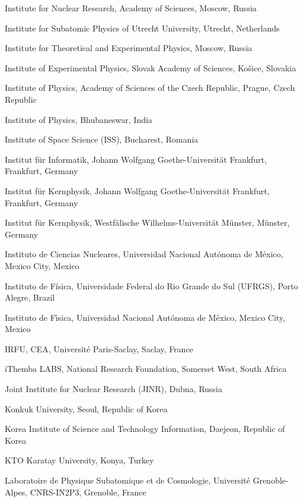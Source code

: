 \begin{flushleft}
\begin{Authlist}
\item {}Institute for Nuclear Research, Academy of Sciences, Moscow, Russia
\item {}Institute for Subatomic Physics of Utrecht University, Utrecht, Netherlands
\item {}Institute for Theoretical and Experimental Physics, Moscow, Russia
\item {}Institute of Experimental Physics, Slovak Academy of Sciences, Ko\v{s}ice, Slovakia
\item {}Institute of Physics, Academy of Sciences of the Czech Republic, Prague, Czech Republic
\item {}Institute of Physics, Bhubaneswar, India
\item {}Institute of Space Science (ISS), Bucharest, Romania
\item {}Institut f\"{u}r Informatik, Johann Wolfgang Goethe-Universit\"{a}t Frankfurt, Frankfurt, Germany
\item {}Institut f\"{u}r Kernphysik, Johann Wolfgang Goethe-Universit\"{a}t Frankfurt, Frankfurt, Germany
\item {}Institut f\"{u}r Kernphysik, Westf\"{a}lische Wilhelms-Universit\"{a}t M\"{u}nster, M\"{u}nster, Germany
\item {}Instituto de Ciencias Nucleares, Universidad Nacional Aut\'{o}noma de M\'{e}xico, Mexico City, Mexico
\item {}Instituto de F\'{i}sica, Universidade Federal do Rio Grande do Sul (UFRGS), Porto Alegre, Brazil
\item {}Instituto de F\'{\i}sica, Universidad Nacional Aut\'{o}noma de M\'{e}xico, Mexico City, Mexico
\item {}IRFU, CEA, Universit\'{e} Paris-Saclay, Saclay, France
\item {}iThemba LABS, National Research Foundation, Somerset West, South Africa
\item {}Joint Institute for Nuclear Research (JINR), Dubna, Russia
\item {}Konkuk University, Seoul, Republic of Korea
\item {}Korea Institute of Science and Technology Information, Daejeon, Republic of Korea
\item {}KTO Karatay University, Konya, Turkey
\item {}Laboratoire de Physique Subatomique et de Cosmologie, Universit\'{e} Grenoble-Alpes, CNRS-IN2P3, Grenoble, France

\end{Authlist}
\end{flushleft}
